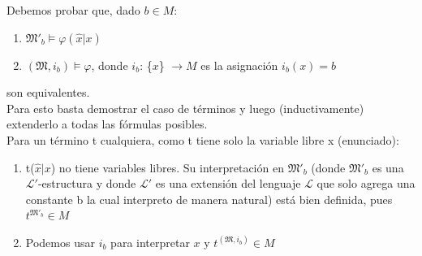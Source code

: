 \begin{sol}
    Debemos probar que, dado $b \in M$: \begin{enumerate}
        \item $\mathfrak{M}'_b \models \varphi (\hat{x}|x)$
        \item $(\mathfrak{M},i_b)\models\varphi$, donde $i_b$: \{$x$\} $\rightarrow M$ es la asignación $i_b(x)=b$
    \end{enumerate}
    son equivalentes.\\
    Para esto basta demostrar el caso de términos y luego (inductivamente) extenderlo a todas las fórmulas posibles.\\
    Para un término t cualquiera, como t tiene solo la variable libre x (enunciado):\begin{enumerate}
        \item t($\hat{x}|x$) no tiene variables libres. Su interpretación en $\mathfrak{M}'_b$ (donde $\mathfrak{M}'_b$ es una $\mathcal{L}'$-estructura y donde $\mathcal{L}'$ es una extensión del lenguaje $\mathcal{L}$ que solo agrega una constante b la cual interpreto de manera natural) está bien definida, pues $t^{\mathfrak{M}'_b} \in M$
        \item Podemos usar $i_b$ para interpretar $x$ y $t^{(\mathfrak{M},i_b)}\in M$


\end{enumerate}
\end{sol}
